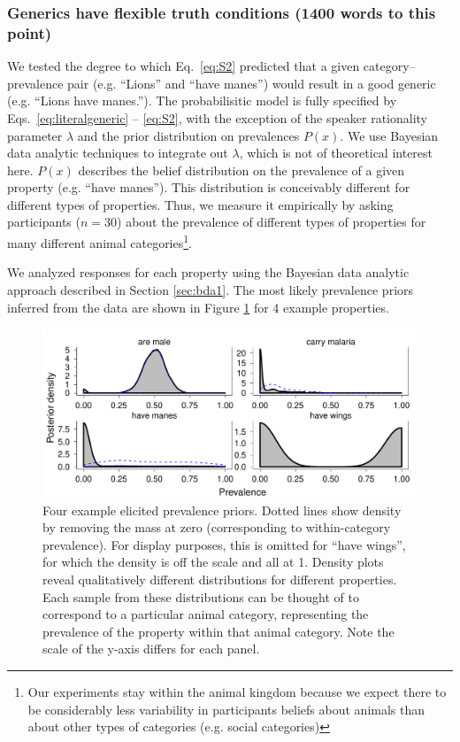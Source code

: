 \documentclass[10pt,letterpaper]{article}
\begin{document}
\subsubsection{Generics have flexible truth conditions (1400 words to this point)} 

We tested the degree to which Eq.~\eqref{eq:S2} predicted that a given category--prevalence pair (e.g. ``Lions'' and ``have manes'') would result in a good generic (e.g. ``Lions have manes.''). 
 The probabilisitic model is fully specified by Eqs.~\eqref{eq:literalgeneric} -- \eqref{eq:S2}, with the exception of the speaker rationality parameter $\lambda$ and the prior distribution on prevalences $P(x)$. 
 We use Bayesian data analytic techniques to integrate out $\lambda$, which is not of theoretical interest here. 
 $P(x)$ describes the belief distribution on the prevalence of a given property (e.g. ``have manes''). 
 This distribution is conceivably different for different types of properties. 
 Thus, we measure it empirically by asking participants ($n=30$) about the prevalence of different types of properties for many different animal categories\footnote{Our experiments stay within the animal kingdom because we expect there to be considerably less variability in participants beliefs about animals than about other types of categories (e.g. social categories)}. 
 
We analyzed responses for each property using the Bayesian data analytic approach described in Section \ref{sec:bda1}.	
The most likely prevalence priors inferred from the data are shown in Figure \ref{fig:priors1a} for 4 example properties.

\begin{figure}
\centering
    \includegraphics[width=0.8\columnwidth]{prevalence_priors_inferred-betas.pdf}
    \caption{Four example elicited prevalence priors. 
    Dotted lines show density by removing the mass at zero (corresponding to within-category prevalence). 
    For display purposes, this is omitted for ``have wings'', for which the density is off the scale and all at 1.
    Density plots reveal qualitatively different distributions for different properties. 
    Each sample from these distributions can be thought of to correspond to a particular animal category, representing the prevalence of the property within that animal category.
    Note the scale of the y-axis differs for each panel.}
  \label{fig:priors1a}
\end{figure}
\end{document}

